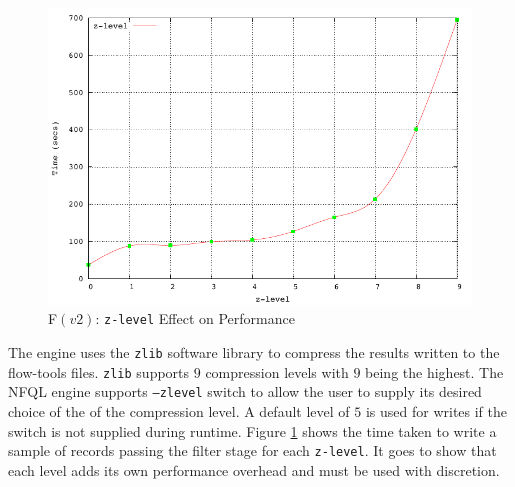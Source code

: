 \begin{figure}[h!]
  \begin{center}
    \includegraphics* [width=0.8\linewidth]{figures/benchmarks/zlevel}
    \caption{F$(v2)$: \texttt{z-level} Effect on Performance}
    \label{fig:engine-zlevel}
  \end{center}
\end{figure}


The engine uses the \texttt{zlib} \cite{rfc1950} software library to compress
the results written to the flow-tools files. \texttt{zlib} supports $9$
compression levels with $9$ being the highest. The \ac{NFQL} engine supports
\texttt{--zlevel}  switch to allow the
user to supply its desired choice of the of the compression level. A default
level of $5$ is used for writes if the switch is not supplied during runtime.
Figure \ref{fig:engine-zlevel} shows the time taken to write a sample of
records passing the filter stage for each \texttt{z-level}. It goes to show
that each level adds its own performance overhead and must be used with
discretion.
